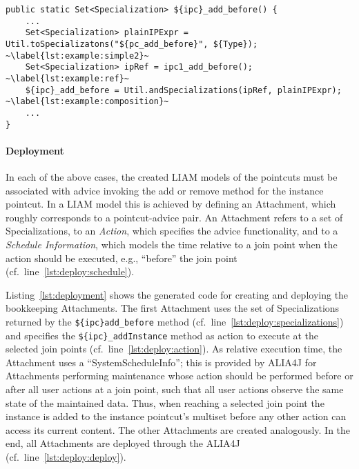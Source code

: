 \begin{lstlisting}[caption={Generated code for creating the LIAM model for the add/before pointcut of the instance pointcut created with expression refinement},label={lst:example:exprRef}]
public static Set<Specialization> ${ipc}_add_before() {
	...
	Set<Specialization> plainIPExpr = Util.toSpecializatons("${pc_add_before}", ${Type}); ~\label{lst:example:simple2}~
	Set<Specialization> ipRef = ipc1_add_before(); ~\label{lst:example:ref}~
	${ipc}_add_before = Util.andSpecializations(ipRef, plainIPExpr); ~\label{lst:example:composition}~
	...
}
\end{lstlisting}

\paragraph{Deployment}

In each of the above cases, the created LIAM models of the pointcuts must be associated with advice invoking the add or remove method for the instance pointcut.
In a LIAM model this is achieved by defining an Attachment, which roughly corresponds to a pointcut-advice pair.
An Attachment refers to a set of Specializations, to an \emph{Action}, which specifies the advice functionality, and to a \emph{Schedule Information}, which models the time relative to a join point when the action should be executed, e.g., ``before'' the join point (cf.\ line~\ref{lst:deploy:schedule}).

Listing~\ref{lst:deployment} shows the generated code for creating and deploying the bookkeeping Attachments.
The first Attachment uses the set of Specializations returned by the \lstinline!${ipc}add_before! method (cf.\ line~\ref{lst:deploy:specializations}) and specifies the \lstinline!${ipc}_addInstance! method as action to execute at the selected join points (cf.\ line~\ref{lst:deploy:action}).
As relative execution time, the Attachment uses a ``SystemScheduleInfo''; this is provided by ALIA4J for Attachments performing maintenance whose action should be performed before or after all user actions at a join point, such that all user actions observe the same state of the maintained data.
Thus, when reaching a selected join point the instance is added to the instance pointcut's multiset before any other action can access its current content.
The other Attachments are created analogously.
In the end, all Attachments are deployed through the ALIA4J  (cf.\ line~\ref{lst:deploy:deploy}).

